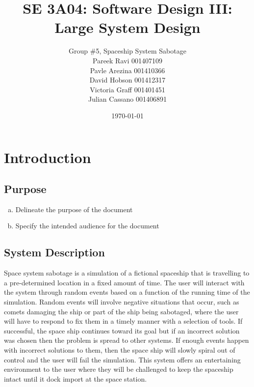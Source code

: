 \documentclass[12pt, titlepage]{article}
\title{SE 3A04: Software Design III: Large System Design}
\author{Group \#5, Spaceship System Sabotage %
		\\Pareek Ravi 001407109
		\\Pavle Arezina 001410366
		\\David Hobson 001412317
		\\Victoria Graff 001401451
		\\Julian Cassano 001406891
}
\date{\today}
\newcommand\tab[1][1cm]{\hspace*{#1}}
\begin{document}
\maketitle	
{}
\tableofcontents
\listoftables
\listoffigures
\newpage

\section{Introduction}
\label{sec:introduction}

\subsection{Purpose}
\label{sub:purpose}
\begin{enumerate}[a)]
	\item Delineate the purpose of the document
	\item Specify the intended audience for the document
\end{enumerate}

\subsection{System Description}
\label{sub:system_description}
\tab Space system sabotage is a simulation of a fictional spaceship that is travelling to a pre-determined location in a fixed amount of time. The user will interact with the system through random events based on a function of the running time of the simulation. Random events will involve negative situations that occur, such as comets damaging the ship or part of the ship being sabotaged, where the user will have to respond to fix them in a timely manner with a selection of tools. If successful, the space ship continues toward its goal but if an incorrect solution was chosen then the problem is spread to other systems. If enough events happen with incorrect solutions to them, then the space ship will slowly spiral out of control and the user will fail the simulation. This system offers an entertaining environment to the user where they will be challenged to keep the spaceship intact until it dock import at the space station.
\end{document}
